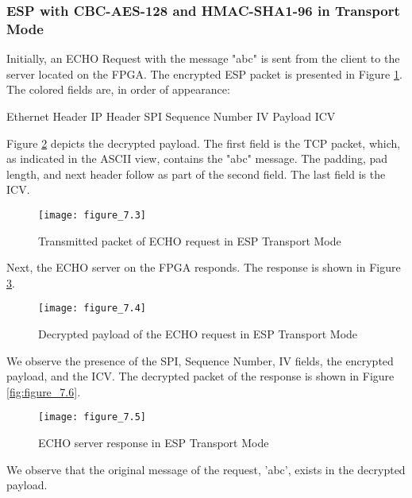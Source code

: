 \subsubsection*{ESP with CBC-AES-128 and HMAC-SHA1-96 in Transport Mode}

Initially, an ECHO Request with the message "abc" is sent from the client to the server located on the FPGA. The encrypted ESP packet is presented in Figure \ref{fig:figure_7.3}. The colored fields are, in order of appearance:
\begin{outline}
    \1 Ethernet Header
    \1 IP Header
    \1 SPI
    \1 Sequence Number
    \1 IV
    \1 Payload
    \1 ICV
\end{outline}

Figure \ref{fig:figure_7.4} depicts the decrypted payload. The first field is the TCP packet, which, as indicated in the ASCII view, contains the "abc" message. The padding, pad length, and next header follow as part of the second field. The last field is the ICV.

\begin{figure}[H]
\centering
\texttt{[image: figure\_7.3]}\\
\caption{ Transmitted packet of ECHO request in ESP Transport Mode  }
\label{fig:figure_7.3}
\end{figure}

Next, the ECHO server on the FPGA responds. The response is shown in Figure \ref{fig:figure_7.5}.

\begin{figure}[H]
\centering
\texttt{[image: figure\_7.4]}\\
\caption{ Decrypted payload of the ECHO request in ESP Transport Mode }
\label{fig:figure_7.4}
\end{figure}

We observe the presence of the SPI, Sequence Number, IV fields, the encrypted payload, and the ICV. The decrypted packet of the response is shown in Figure \ref{fig:figure_7.6}.

\begin{figure}[H]
\centering
\texttt{[image: figure\_7.5]}\\
\caption{ ECHO server response in ESP Transport Mode }
\label{fig:figure_7.5}
\end{figure}

We observe that the original message of the request, 'abc', exists in the decrypted payload.

